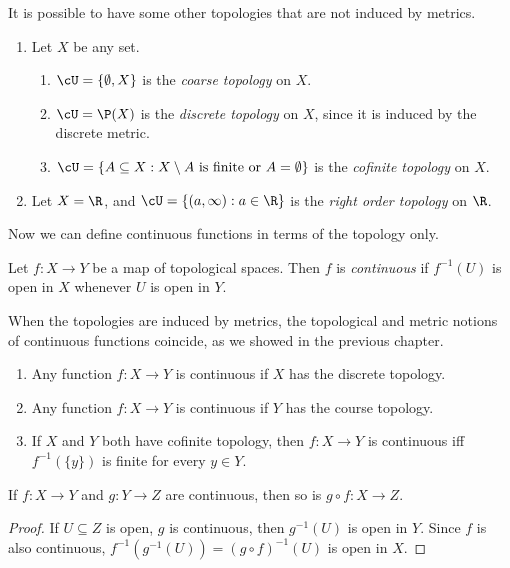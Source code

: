 \documentclass[a4paper]{article}
\begin{document}
It is possible to have some other topologies that are not induced by metrics.
\begin{eg}\leavevmode
  \begin{enumerate}
    \item Let $X$ be any set.
      \begin{enumerate}
        \item $\cU = \{\emptyset, X\}$ is the \emph{coarse topology} on $X$.
        \item $\cU = \P(X)$ is the \emph{discrete topology} on $X$, since it is induced by the discrete metric.
        \item $\cU = \{A\subseteq X: X\setminus A\text{ is finite or } A = \emptyset\}$ is the \emph{cofinite topology} on $X$.
      \end{enumerate}
    \item Let $X = \R$, and $\cU = \{(a, \infty): a\in \R\}$ is the \emph{right order topology} on $\R$.
  \end{enumerate}
\end{eg}

Now we can define continuous functions in terms of the topology only.
\begin{defi}
  Let $f: X\to Y$ be a map of topological spaces. Then $f$ is \emph{continuous} if $f^{-1}(U)$ is open in $X$ whenever $U$ is open in $Y$.
\end{defi}
When the topologies are induced by metrics, the topological and metric notions of continuous functions coincide, as we showed in the previous chapter.

\begin{eg}\leavevmode
  \begin{enumerate}
    \item Any function $f: X\to Y$ is continuous if $X$ has the discrete topology.
    \item Any function $f: X\to Y$ is continuous if $Y$ has the course topology.
    \item If $X$ and $Y$ both have cofinite topology, then $f: X\to Y$ is continuous iff $f^{-1}(\{y\})$ is finite for every $y\in Y$.
  \end{enumerate}
\end{eg}

\begin{lemma}
  If $f: X\to Y$ and $g: Y\to Z$ are continuous, then so is $g\circ f: X\to Z$.
\end{lemma}

\begin{proof}
  If $U\subseteq Z$ is open, $g$ is continuous, then $g^{-1}(U)$ is open in $Y$. Since $f$ is also continuous, $f^{-1}(g^{-1}(U)) = (g\circ f)^{-1}(U)$ is open in $X$.
\end{proof}
\end{document}

